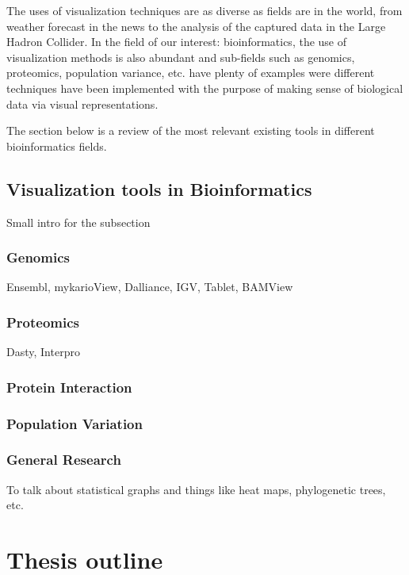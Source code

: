 The uses of visualization techniques are as diverse as fields are in the world, from weather forecast in the news to the analysis of the captured data in the Large Hadron Collider. In the field of our interest: bioinformatics, the use of visualization methods is also abundant and sub-fields such as genomics, proteomics, population variance, etc. have plenty of examples were different techniques have been implemented with the purpose of making sense of biological data via visual representations.

The section below is a review of the most relevant existing tools in different bioinformatics fields.
\subsection{Visualization tools in Bioinformatics}
Small intro for the subsection
\subsubsection{Genomics}
Ensembl, mykarioView, Dalliance, IGV, Tablet, BAMView
\subsubsection{Proteomics}
Dasty, Interpro
\subsubsection{Protein Interaction}
\subsubsection{Population Variation}
\subsubsection{General Research}
To talk about statistical graphs and things like heat maps, phylogenetic trees, etc.


\section{Thesis outline}
